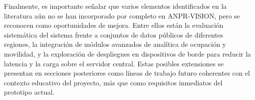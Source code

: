 Finalmente, es importante señalar que varios elementos identificados en la literatura aún no se han incorporado por completo en ANPR-VISION, pero se reconocen como oportunidades de mejora. Entre ellos están la evaluación sistemática del sistema frente a conjuntos de datos públicos de diferentes regiones, la integración de módulos avanzados de analítica de ocupación y movilidad, y la exploración de despliegues en dispositivos de borde para reducir la latencia y la carga sobre el servidor central. Estas posibles extensiones se presentan en secciones posteriores como líneas de trabajo futuro coherentes con el contexto educativo del proyecto, más que como requisitos inmediatos del prototipo actual.